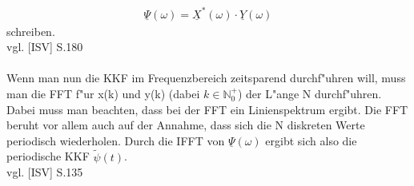 \begin{align}
\boxed{\underline \Psi(\omega) = \underline{X}^*(\omega) \cdot \underline{Y}(\omega)}
\end{align}
schreiben.
\\vgl. [ISV] S.180
\\\\
Wenn man nun die KKF im Frequenzbereich zeitsparend durchf"uhren will, muss man die FFT f"ur x(k) und y(k) (dabei $k \in \mathbb{N}^+_0$) der L"ange N durchf"uhren. Dabei muss man beachten, dass bei der FFT ein Linienspektrum ergibt. Die FFT beruht vor allem auch auf der Annahme, dass sich die N diskreten Werte periodisch wiederholen. Durch die IFFT von $ \underline \Psi(\omega)$ ergibt sich also die periodische KKF $\tilde{\psi}(t)$.
\\vgl. [ISV] S.135
